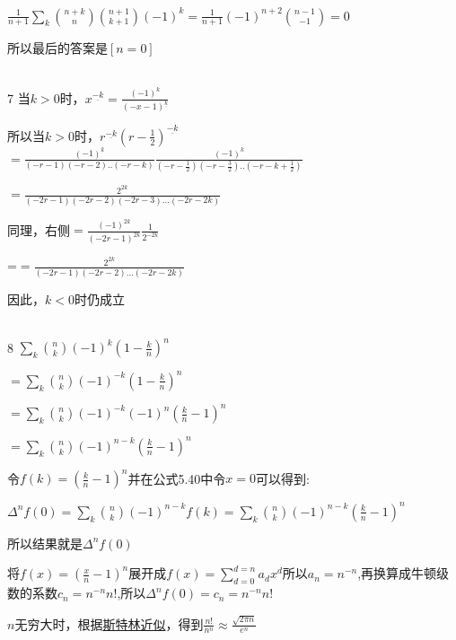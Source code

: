 \documentclass[onecolumn]{article}
\begin{document}
$\frac{1}{n+1}\sum_{k}\binom{n+k}{n}\binom{n+1}{k+1}(-1)^{k}=\frac{1}{n+1}(-1)^{n+2}\binom{n-1}{-1}=0$ \par
所以最后的答案是$[n=0]$ \par
~\\ 
7 当$k>0$时，$x^{\underline{-k}}=\frac{(-1)^{k}}{(-x-1)^{\underline{k}}}$ \par
所以当$k>0$时，$r^{\underline{-k}}(r-\frac{1}{2})^{\underline{-k}}$
$=\frac{(-1)^{k}}{(-r-1)(-r-2)..(-r-k)}\frac{(-1)^{k}}{(-r-\frac{1}{2})(-r-\frac{3}{2})..(-r-k+\frac{1}{2})}$ \par
$=\frac{2^{2k}}{(-2r-1)(-2r-2)(-2r-3)...(-2r-2k)}$ \par
同理，右侧$=\frac{(-1)^{2k}}{(-2r-1)^{2k}}\frac{1}{2^{-2k}}$ \par
=$=\frac{2^{2k}}{(-2r-1)(-2r-2)...(-2r-2k)}$ \par
因此，$k<0$时仍成立 \par
~\\
8 $\sum_{k}\binom{n}{k}(-1)^{k}(1-\frac{k}{n})^{n}$ \par
$=\sum_{k}\binom{n}{k}(-1)^{-k}(1-\frac{k}{n})^{n}$ \par
$=\sum_{k}\binom{n}{k}(-1)^{-k}(-1)^{n}(\frac{k}{n}-1)^{n}$ \par
$=\sum_{k}\binom{n}{k}(-1)^{n-k}(\frac{k}{n}-1)^{n}$ \par
令$f(k)=(\frac{k}{n}-1)^{n}$并在公式5.40中令$x=0$可以得到: \par
$\Delta^{n}f(0)=\sum_{k}\binom{n}{k}(-1)^{n-k}f(k)=\sum_{k}\binom{n}{k}(-1)^{n-k}(\frac{k}{n}-1)^{n}$ \par
所以结果就是$\Delta^{n}f(0)$ \par
将$f(x)=(\frac{x}{n}-1)^{n}$展开成$f(x)=\sum_{d=0}^{d=n}a_{d}x^{d}$所以$a_{n}=n^{-n}$,再换算成牛顿级数的系数$c_{n}=n^{-n}n!$,所以$\Delta^{n}f(0)=c_{n}=n^{-n}n!$ \par
$n$无穷大时，根据\href{https://baike.baidu.com/item/%E6%96%AF%E7%89%B9%E6%9E%97%E5%85%AC%E5%BC%8F/9583086}{斯特林近似}，得到$\frac{n!}{n^{n}}\approx \frac{\sqrt{2 \pi n}}{e^{n}}$ \par
~\\
\end{document}
